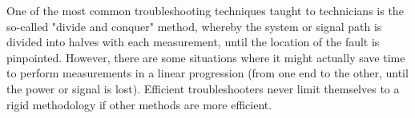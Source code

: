 





One of the most common troubleshooting techniques taught to technicians is the so-called "divide and conquer" method, whereby the system or signal path is divided into halves with each measurement, until the location of the fault is pinpointed.  However, there are some situations where it might actually save time to perform measurements in a linear progression (from one end to the other, until the power or signal is lost).  Efficient troubleshooters never limit themselves to a rigid methodology if other methods are more efficient.




